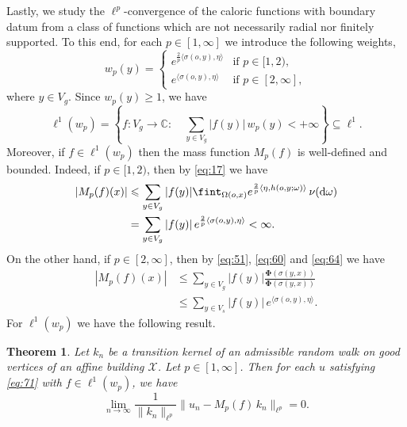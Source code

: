 \documentclass[11pt]{amsart}
\newcommand{\scrX}{\mathscr{X}}
\newcommand{\sprod}[2]{\langle {#1}, {#2} \rangle}
\theoremstyle{plain}
\newcounter{thm}
\newtheorem{theorem}{Theorem}[section]
\theoremstyle{definition}
\numberwithin{equation}{section}
\begin{document}
Lastly, we study the $\ell^p$-convergence of the caloric functions with boundary datum from a class of functions which are not 
necessarily radial nor finitely supported. To this end, for each $p \in [1, \infty]$ we introduce the following weights,
\[
	w_p(y)=\begin{cases}
		e^{\frac{2}{p} \sprod{\sigma(o,y)}{\eta}} &\text{if } p \in [1, 2), \\
		e^{ \sprod{\sigma(o,y)}{\eta}} &\text{if } p \in [2, \infty],
	\end{cases}
\]
where $y \in V_g$. Since $w_p(y) \geqslant 1$, we have
\[
	\ell^1(w_p)=\left\{f:V_g\rightarrow \mathbb{C}:\quad \sum_{y\in V_g}|f(y)|\,w_p(y)<+\infty \right\}\subseteq \ell^1.
\]
Moreover, if $f \in \ell^1(w_p)$ then the mass function $M_p(f)$ is well-defined and bounded. 
Indeed, if $p \in [1, 2)$, then by \eqref{eq:17} we have 
\begin{align*}
	|M_p(f)(x)|
	&\leqslant
	\sum_{y\in V_g} |f(y)| 
	\fint_{\Omega(o,x)} e^{\frac{2}{p} \sprod{\eta}{h(o, y;\omega)}} \, \nu({\rm d}\omega) \\
	&=\sum_{y\in V_g} |f(y)|\, e^{\frac{2}{p} \sprod{\sigma(o, y)}{\eta}} < \infty.
\end{align*}
On the other hand, if $p \in [2, \infty]$, then by \eqref{eq:51}, \eqref{eq:60} and \eqref{eq:64} we have
\begin{align*}
	|M_p(f)(x)|
	&\leqslant
	\sum_{y \in V_g} |f(y)| \frac{\mathbf{\Phi}(\sigma(y, x))}{\mathbf{\Phi}(\sigma(y, x))} \\
	&\leqslant
	\sum_{y\in V_s} |f(y)|\, e^{ \sprod{\sigma(o,y)}{\eta}}.
\end{align*}
For $\ell^1(w_p)$ we have the following result.
\begin{theorem}
	\label{thm:10}
	Let $k_n$ be a transition kernel of an admissible random walk on good vertices of an affine building $\scrX$.
	Let $p \in [1, \infty]$. Then for each $u$ satisfying \eqref{eq:71} with $f \in \ell^1(w_p)$, we have
	\[
		\lim_{n \to \infty}
		\frac{1}{\|k_n \|_{\ell^p}}
		\big\|u_n-M_p(f) \, k_n\|_{\ell^p} = 0.
	\]
\end{theorem}
\end{document}
